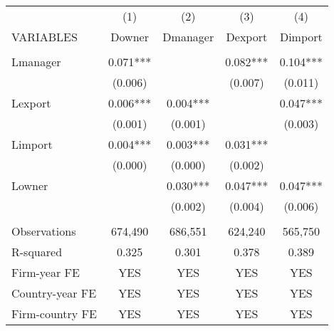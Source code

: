 \begin{tabular}{lcccc} \hline
 & (1) & (2) & (3) & (4) \\
VARIABLES & Downer & Dmanager & Dexport & Dimport \\ \hline
 &  &  &  &  \\
Lmanager & 0.071*** &  & 0.082*** & 0.104*** \\
 & (0.006) &  & (0.007) & (0.011) \\
Lexport & 0.006*** & 0.004*** &  & 0.047*** \\
 & (0.001) & (0.001) &  & (0.003) \\
Limport & 0.004*** & 0.003*** & 0.031*** &  \\
 & (0.000) & (0.000) & (0.002) &  \\
Lowner &  & 0.030*** & 0.047*** & 0.047*** \\
 &  & (0.002) & (0.004) & (0.006) \\
 &  &  &  &  \\
Observations & 674,490 & 686,551 & 624,240 & 565,750 \\
R-squared & 0.325 & 0.301 & 0.378 & 0.389 \\
Firm-year FE & YES & YES & YES & YES \\
Country-year FE & YES & YES & YES & YES \\
 Firm-country FE & YES & YES & YES & YES \\ \hline
\end{tabular}
